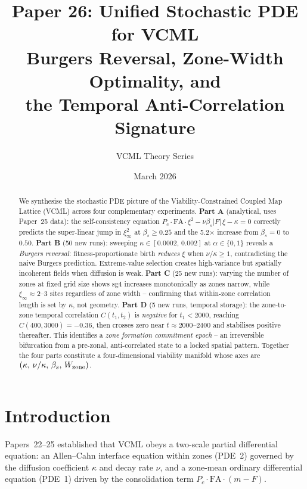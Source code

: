 \documentclass[11pt,a4paper]{article}
\title{\textbf{Paper 26: Unified Stochastic PDE for VCML}\\[4pt]
\large Burgers Reversal, Zone-Width Optimality, and\\
the Temporal Anti-Correlation Signature}
\author{VCML Theory Series}
\date{March 2026}
\begin{document}
\maketitle

\begin{abstract}
We synthesise the stochastic PDE picture of the Viability-Constrained Coupled
Map Lattice (VCML) across four complementary experiments.
\textbf{Part A} (analytical, uses Paper~25 data): the self-consistency equation
$P_c \cdot \mathrm{FA} \cdot \xi^2 - \nu\beta_s|F|\,\xi - \kappa = 0$
correctly predicts the super-linear jump in $\xi_\infty^2$ at
$\beta_s \geq 0.25$ and the 5.2$\times$ increase from $\beta_s=0$ to $0.50$.
\textbf{Part B} (50 new runs): sweeping $\kappa \in [0.0002,\,0.002]$ at
$\alpha\in\{0,1\}$ reveals a \emph{Burgers reversal}: fitness-proportionate
birth \emph{reduces} $\xi$ when $\nu/\kappa \geq 1$, contradicting the naive
Burgers prediction.  Extreme-value selection creates high-variance but
spatially incoherent fields when diffusion is weak.
\textbf{Part C} (25 new runs): varying the number of zones at fixed grid size
shows sg4 increases monotonically as zones narrow, while $\xi_\infty \approx
2$--$3$ sites regardless of zone width -- confirming that within-zone
correlation length is set by $\kappa$, not geometry.
\textbf{Part D} (5 new runs, temporal storage): the zone-to-zone temporal
correlation $C(t_1,t_2)$ is \emph{negative} for $t_1 < 2000$, reaching
$C(400, 3000) = -0.36$, then crosses zero near $t \approx 2000$--$2400$ and
stabilises positive thereafter. This identifies a \emph{zone formation
commitment epoch} -- an irreversible bifurcation from a pre-zonal,
anti-correlated state to a locked spatial pattern.
Together the four parts constitute a four-dimensional viability manifold
whose axes are $(\kappa,\,\nu/\kappa,\,\beta_s,\,W_{\rm zone})$.
\end{abstract}

\section{Introduction}

Papers~22--25 established that VCML obeys a two-scale partial differential
equation: an Allen--Cahn interface equation within zones (PDE~2) governed by
the diffusion coefficient $\kappa$ and decay rate $\nu$, and a zone-mean
ordinary differential equation (PDE~1) driven by the consolidation term
$P_c \cdot \mathrm{FA} \cdot (m - F)$.
\end{document}
